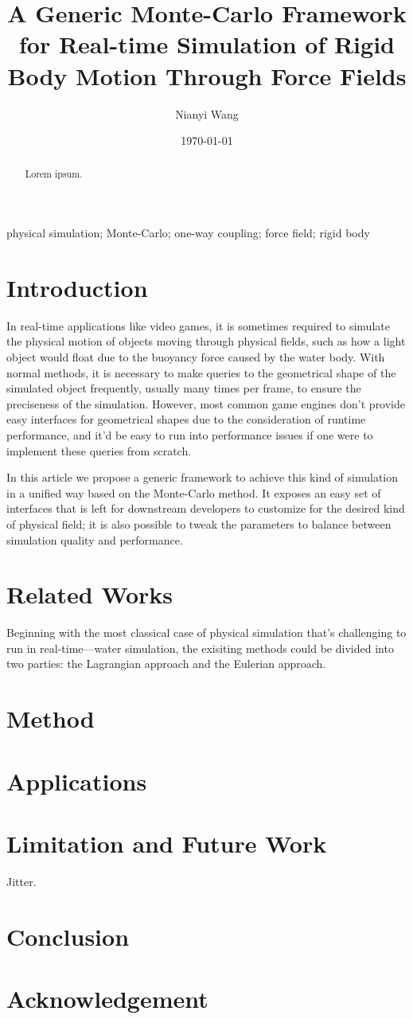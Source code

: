 \documentclass{article}
\title{A Generic Monte-Carlo Framework for Real-time Simulation of Rigid Body Motion Through Force Fields}
\author{Nianyi Wang}
\date{\today}
\begin{document}
\maketitle

\begin{abstract}
	Lorem ipsum.
\end{abstract}

\begin{keywords}
	physical simulation;
	Monte-Carlo;
	one-way coupling;
	force field;
	rigid body
\end{keywords}

\section{Introduction}

In real-time applications like video games, it is sometimes required to simulate the physical motion of objects moving through physical fields, such as how a light object would float due to the buoyancy force caused by the water body.
With normal methods, it is necessary to make queries to the geometrical shape of the simulated object frequently, usually many times per frame, to ensure the preciseness of the simulation.
However, most common game engines don't provide easy interfaces for geometrical shapes due to the consideration of runtime performance, and it'd be easy to run into performance issues if one were to implement these queries from scratch.

In this article we propose a generic framework to achieve this kind of simulation in a unified way based on the Monte-Carlo method.
It exposes an easy set of interfaces that is left for downstream developers to customize for the desired kind of physical field;
it is also possible to tweak the parameters to balance between simulation quality and performance.

\section{Related Works}

Beginning with the most classical case of physical simulation that's challenging to run in real-time---water simulation, the exisiting methods could be divided into two parties: the Lagrangian approach and the Eulerian approach.

\cite{BAR01}

\section{Method}

\section{Applications}

\section{Limitation and Future Work}

Jitter.

\section{Conclusion}

\section*{Acknowledgement}

\printbibliography
\end{document}
